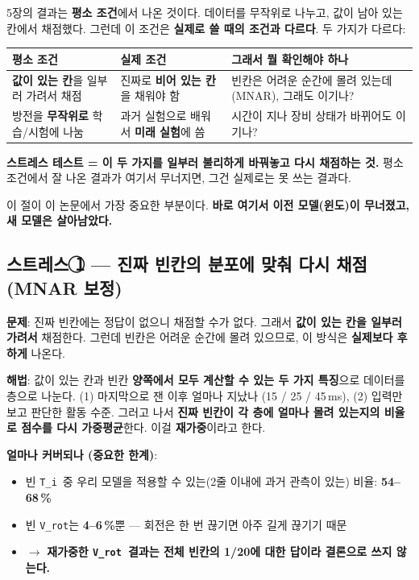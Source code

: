 \documentclass[10pt]{article}
\newcommand{\Ti}{\texttt{T\_i}}
\newcommand{\Vrot}{\texttt{V\_rot}}
\begin{document}
5장의 결과는 \textbf{평소 조건}에서 나온 것이다. 데이터를 무작위로 나누고, 값이 남아 있는
칸에서 채점했다. 그런데 이 조건은 \textbf{실제로 쓸 때의 조건과 다르다}. 두 가지가 다르다:

\begin{center}
\begin{tabularx}{\textwidth}{@{}L L L@{}}
\toprule
\textbf{평소 조건} & \textbf{실제 조건} & \textbf{그래서 뭘 확인해야 하나} \\
\midrule
\textbf{값이 있는 칸}을 일부러 가려서 채점 & 진짜로 \textbf{비어 있는 칸}을 채워야 함 &
  빈칸은 어려운 순간에 몰려 있는데(MNAR), 그래도 이기나? \\
방전을 \textbf{무작위로} 학습/시험에 나눔 & 과거 실험으로 배워서 \textbf{미래 실험}에 씀 &
  시간이 지나 장비 상태가 바뀌어도 이기나? \\
\bottomrule
\end{tabularx}
\end{center}

\textbf{스트레스 테스트 = 이 두 가지를 일부러 불리하게 바꿔놓고 다시 채점하는 것.} 평소
조건에서 잘 나온 결과가 여기서 무너지면, 그건 실제로는 못 쓰는 결과다.

이 절이 이 논문에서 가장 중요한 부분이다. \textbf{바로 여기서 이전 모델(윈도)이 무너졌고,
새 모델은 살아남았다.}

\subsection{스트레스 \textcircled{1} --- 진짜 빈칸의 분포에 맞춰 다시 채점 (MNAR 보정)}

\textbf{문제}: 진짜 빈칸에는 정답이 없으니 채점할 수가 없다. 그래서 \textbf{값이 있는 칸을
일부러 가려서} 채점한다. 그런데 빈칸은 어려운 순간에 몰려 있으므로, 이 방식은 \textbf{실제보다
후하게} 나온다.

\textbf{해법}: 값이 있는 칸과 빈칸 \textbf{양쪽에서 모두 계산할 수 있는 두 가지 특징}으로
데이터를 층으로 나눈다. (1) 마지막으로 잰 이후 얼마나 지났나 (15 / 25 / 45\,ms),
(2) 입력만 보고 판단한 활동 수준. 그러고 나서 \textbf{진짜 빈칸이 각 층에 얼마나 몰려
있는지의 비율로 점수를 다시 가중평균}한다. 이걸 \textbf{재가중}이라고 한다.

\textbf{얼마나 커버되나 (중요한 한계)}:
\begin{itemize}
\item 빈 \Ti\ 중 우리 모델을 적용할 수 있는(2줄 이내에 과거 관측이 있는) 비율:
  \textbf{54--68\,\%}
\item 빈 \Vrot 는 \textbf{4--6\,\%}뿐 --- 회전은 한 번 끊기면 아주 길게 끊기기 때문
\item $\rightarrow$ \textbf{재가중한 \Vrot\ 결과는 전체 빈칸의 1/20에 대한 답이라 결론으로
  쓰지 않는다.}
\end{itemize}
\end{document}
